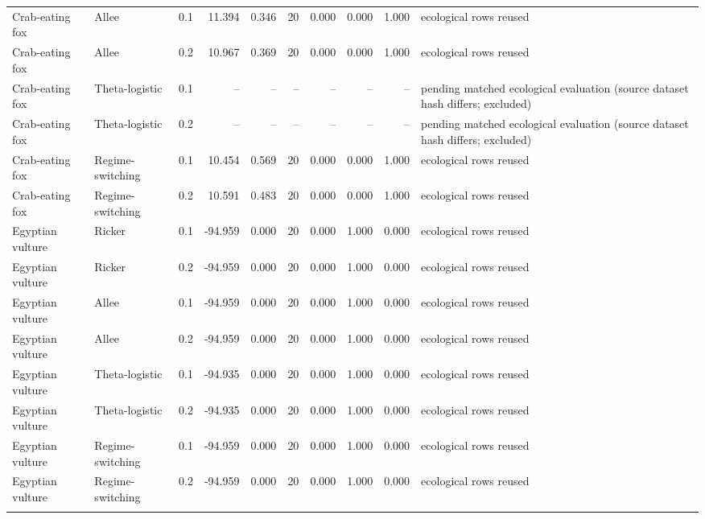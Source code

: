 \documentclass[10pt]{article}
\begin{document}
\begin{landscape}
\begin{center}
\begin{longtable}{@{}lllrrrrrrp{4.5cm}@{}}
\addlinespace[1pt]
Crab-eating fox & Allee & 0.1 & 11.394 & 0.346 & 20 & 0.000 & 0.000 & 1.000 & ecological rows reused \\
Crab-eating fox & Allee & 0.2 & 10.967 & 0.369 & 20 & 0.000 & 0.000 & 1.000 & ecological rows reused \\
\addlinespace[1pt]
Crab-eating fox & Theta-logistic & 0.1 & -- & -- & -- & -- & -- & -- & pending matched ecological evaluation (source dataset hash differs; excluded) \\
Crab-eating fox & Theta-logistic & 0.2 & -- & -- & -- & -- & -- & -- & pending matched ecological evaluation (source dataset hash differs; excluded) \\
\addlinespace[1pt]
Crab-eating fox & Regime-switching & 0.1 & 10.454 & 0.569 & 20 & 0.000 & 0.000 & 1.000 & ecological rows reused \\
Crab-eating fox & Regime-switching & 0.2 & 10.591 & 0.483 & 20 & 0.000 & 0.000 & 1.000 & ecological rows reused \\
\addlinespace[1pt]
Egyptian vulture & Ricker & 0.1 & -94.959 & 0.000 & 20 & 0.000 & 1.000 & 0.000 & ecological rows reused \\
Egyptian vulture & Ricker & 0.2 & -94.959 & 0.000 & 20 & 0.000 & 1.000 & 0.000 & ecological rows reused \\
\addlinespace[1pt]
Egyptian vulture & Allee & 0.1 & -94.959 & 0.000 & 20 & 0.000 & 1.000 & 0.000 & ecological rows reused \\
Egyptian vulture & Allee & 0.2 & -94.959 & 0.000 & 20 & 0.000 & 1.000 & 0.000 & ecological rows reused \\
\addlinespace[1pt]
Egyptian vulture & Theta-logistic & 0.1 & -94.935 & 0.000 & 20 & 0.000 & 1.000 & 0.000 & ecological rows reused \\
Egyptian vulture & Theta-logistic & 0.2 & -94.935 & 0.000 & 20 & 0.000 & 1.000 & 0.000 & ecological rows reused \\
\addlinespace[1pt]
Egyptian vulture & Regime-switching & 0.1 & -94.959 & 0.000 & 20 & 0.000 & 1.000 & 0.000 & ecological rows reused \\
Egyptian vulture & Regime-switching & 0.2 & -94.959 & 0.000 & 20 & 0.000 & 1.000 & 0.000 & ecological rows reused \\
\addlinespace[1pt]
\end{longtable}
\end{center}
\end{landscape}
\end{document}
